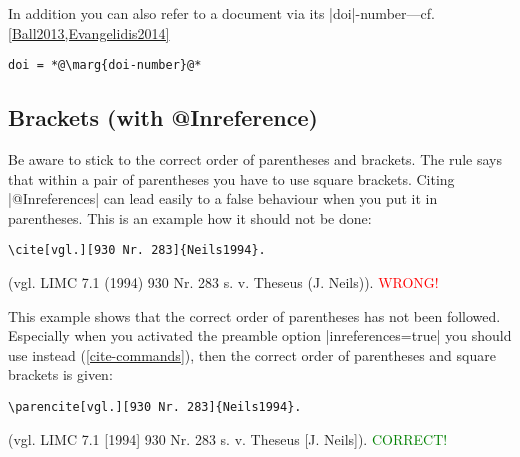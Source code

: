 \documentclass[a4paper,
10pt,
greek,
french,
spanish,
italian,
ngerman,
english
]{ltxdoc}
\begin{document}
 In addition you can also refer to a document via its |doi|-number---cf. \cref{Ball2013,Evangelidis2014} 
\begin{lstlisting}
doi = *@\marg{doi-number}@*
\end{lstlisting}	

\subsection{Brackets (with @Inreference)}\label{faq:inreference}
Be aware to stick to the correct order of parentheses and brackets.
The rule says that within a pair of parentheses you have to use square brackets.
Citing |@Inreferences| can lead easily to a false behaviour when you put it in parentheses.
This is an example how it should not be done:
\begin{lstlisting}
\cite[vgl.][930 Nr. 283]{Neils1994}.
\end{lstlisting}
 \begin{bsp}
(vgl. LIMC 7.1 (1994) 930 Nr. 283 s. v. Theseus (J. Neils)). \textcolor{red}{WRONG!}
\end{bsp}
 
\DescribeMacro{\parencite} \DescribeMacro{\parencites}
This example shows that the correct order of parentheses has not been followed.
Especially when you activated the preamble option  |inreferences=true|  you should use  instead (\cref{cite-commands}), then the correct order of parentheses and square brackets is given:
\begin{lstlisting}
\parencite[vgl.][930 Nr. 283]{Neils1994}.
\end{lstlisting}

\begin{bsp} 
(vgl. LIMC 7.1 [1994] 930 Nr. 283 s. v. Theseus [J. Neils]). \textcolor{green}{CORRECT!}
\end{bsp}
\end{document}

